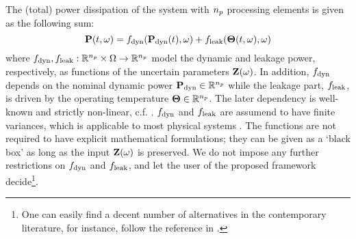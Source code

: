 The (total) power dissipation of the system with ${n_p}$ processing elements is given as the following sum:
\begin{equation} \elabel{power-model}
  \vP(\t, \o) = f_\dyn(\vP_\dyn(\t), \o) + f_\leak(\vTO(\t, \o), \o)
\end{equation}
where $f_{\text{dyn}}, f_{\text{leak}}: \mathbb{R}^{n_p} \times \Omega \to \mathbb{R}^{n_p}$ model the dynamic and leakage power, respectively, as functions of the uncertain parameters $\mathbf{Z}(\omega)$. In addition, $f_{\text{dyn}}$ depends on the nominal dynamic power $\mathbf{P}_{\text{dyn}} \in \mathbb{R}^{n_p}$ while the leakage part, $f_{\text{leak}}$, is driven by the operating temperature ${\boldsymbol\Theta} \in \mathbb{R}^{n_p}$. The later dependency is well-known and strictly non-linear, c.f. \cite{srivastava2010, liu2007}. $f_{\text{dyn}}$ and $f_{\text{leak}}$ are assumend to have finite variances, which is applicable to most physical systems \cite{xiu2002}. The functions are not required to have explicit mathematical formulations; they can be given as a `black box' as long as the input $\mathbf{Z}(\omega)$ is preserved. We do not impose any further restrictions on $f_{\text{dyn}}$ and $f_{\text{leak}}$, and let the user of the proposed framework decide\footnote{One can easily find a decent number of alternatives in the contemporary literature, for instance, follow the reference in \cite{srivastava2010}.}.
